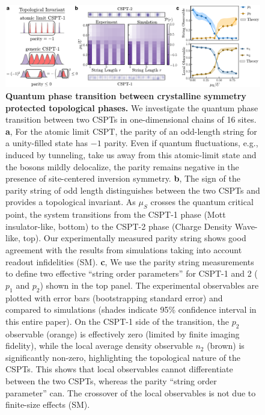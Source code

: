 \documentclass[preprint,superscriptaddress,floatfix, nofootinbib]{revtex4-2}
\begin{document}
\begin{figure}
    \centering
    \includegraphics[width=\textwidth]{figures/Fig_CSPT_ground.pdf}
    \caption{\textbf{Quantum phase transition between crystalline symmetry protected topological phases.} We investigate the quantum phase transition between two CSPTs in one-dimensional chains of 16 sites. \textbf{a}, For the atomic limit CSPT, the parity of an odd-length string for a unity-filled state has $-1$ parity.
    Even if quantum fluctuations, e.g., induced by tunneling, take us away from this atomic-limit state and the bosons mildly delocalize, the parity remains negative in the presence of site-centered inversion symmetry. \textbf{b}, The sign of the parity string of odd length distinguishes between the two CSPTs and provides a topological invariant.
    As $\mu_S$ crosses the quantum critical point, the system transitions from the CSPT-1 phase (Mott insulator-like, bottom) to the CSPT-2 phase (Charge Density Wave-like, top).
    Our experimentally measured parity string shows good agreement with the results from simulations taking into account readout infidelities (SM).
    \textbf{c}, We use the parity string measurements to define two effective ``string order parameters'' for CSPT-1 and 2 ($p_1$ and $p_2$) shown in the top panel.
    The experimental observables are plotted with error bars (bootstrapping standard error) and compared to simulations (shades indicate 95\% confidence interval in this entire paper).
    On the CSPT-1 side of the transition, the $p_2$ observable (orange) is effectively zero (limited by finite imaging fidelity), while the local average density observable $n_2$ (brown) is significantly non-zero, highlighting the topological nature of the CSPTs. This shows that local observables cannot differentiate between the two CSPTs, whereas the parity ``string order parameter'' can. The crossover of the local observables is not due to finite-size effects (SM).
    }
    \label{fig: CSPT_ground}
\end{figure}
\end{document}
